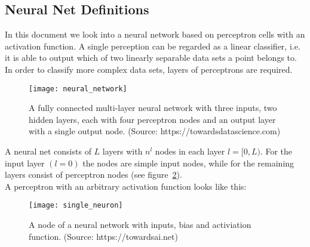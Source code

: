 \subsection{Neural Net Definitions}

In this document we look into a neural network based on perceptron cells with an
activation function. A single perception can be regarded as a linear classifier, i.e. it
is able to output which of two linearly separable data sets a point belongs to. In order
to classify more complex data sets, layers of perceptrons are required.

\begin{figure}[h] \centering
    \texttt{[image: neural\_network]} \caption{A fully
    connected multi-layer neural network with three inputs, two
    hidden layers, each with four perceptron nodes and an output layer with a
    single output node. (Source: https://towardsdatascience.com)} \label{fig:neural_network}
\end{figure}

A neural net consists of $L$ layers with $n^l$ nodes in each layer $l=[0,L)$. For the
input layer $(l=0)$ the nodes are simple input nodes, while for the remaining layers
consist of perceptron nodes (see figure~\ref{fig:percptron}). \\

A perceptron with an arbitrary activation function looks like this:
\begin{figure}[h] \centering \texttt{[image: single\_neuron]}
    \caption{A node of a neural network with inputs, bias and activiation function.
    (Source: https://towardsai.net)}
    \label{fig:percptron}
\end{figure}

